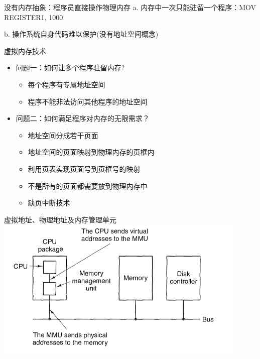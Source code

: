 \documentclass[xcolor=svgnames]{beamer}
\begin{document}
\begin{CJK*}{UTF8}{gbsn}
\begin{frame}{没有内存抽象：程序员直接操作物理内存}
a. 内存中一次只能驻留一个程序：\alert{MOV REGISTER1, 1000}

b. 操作系统自身代码难以保护(没有地址空间概念)
\end{frame}

\begin{frame}{虚拟内存技术}
\begin{itemize}
\item 问题一：如何让多个程序驻留内存?
\begin{itemize}
\item 每个程序有专属地址空间
\item 程序不能非法访问其他程序的地址空间
\end{itemize}
\item 问题二：如何满足程序对内存的无限需求？
\begin{itemize}
\item 地址空间分成若干\alert{页面}
\item 地址空间的页面映射到物理内存的\alert{页框}内
\item 利用\alert{页表}实现页面号到页框号的映射
\item 不是所有的页面都需要放到物理内存中
\item 缺页中断技术
\end{itemize}
\end{itemize}
\end{frame}

\begin{frame}{虚拟地址、物理地址及内存管理单元}
\includegraphics[width=0.9\textwidth]{mmu.png}
\end{frame}



\end{CJK*}
\end{document}
